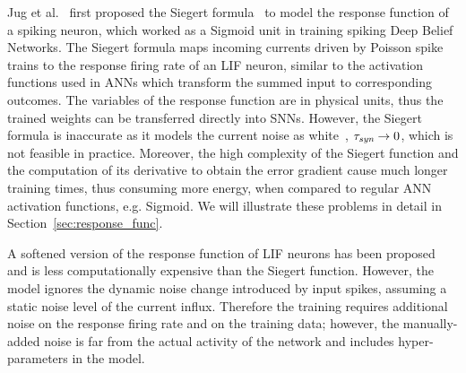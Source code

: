 	Jug et al.~\citep{Jug_etal_2012} first proposed the Siegert formula~\citep{siegert1951first} to model the response function of a spiking neuron, which worked as a Sigmoid unit in training spiking Deep Belief Networks.
	The Siegert formula maps incoming currents driven by Poisson spike trains to the response firing rate of an LIF neuron, similar to the activation functions used in ANNs which transform the summed input to corresponding outcomes.
	The variables of the response function are in physical units, thus the trained weights can be transferred directly into SNNs.
	However, the Siegert formula is inaccurate as it models the current noise as white~\citep{liu2016noisy}, $\tau_{\textit{\textrm{syn}}} \to 0$, which is not feasible in practice.
	Moreover, the high complexity of the Siegert function and the computation of its derivative to obtain the error gradient cause much longer training times, thus consuming more energy, when compared to regular ANN activation functions, e.g. Sigmoid.
	We will illustrate these problems in detail in Section~\ref{sec:response_func}. %

	A softened version of the response function of LIF neurons has been proposed~\citep{hunsberger2015spiking} and is less computationally expensive than the Siegert function.
	However, the model ignores the dynamic noise change introduced by input spikes, assuming a static noise level of the current influx.
	Therefore the training requires additional noise on the response firing rate and on the training data;
	however, the manually-added noise is far from the actual activity of the network and includes hyper-parameters in the model.

